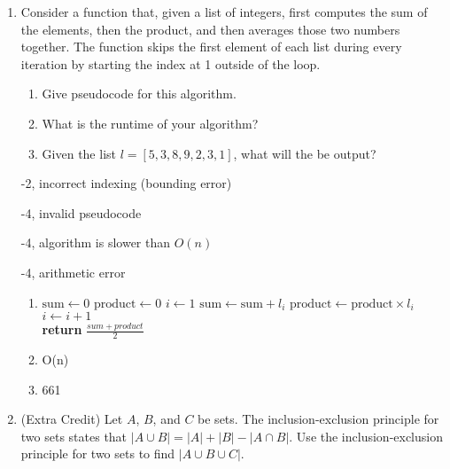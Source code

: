 \begin{enumerate}
\begin{solution}
\end{solution}

\item Consider a function that, given a list of integers, first computes the sum of the elements, then the product, and then averages those two numbers together. The function skips the first element of each list during every iteration by starting the index at 1 outside of the loop. 
\begin{enumerate}
    \item Give pseudocode for this algorithm.
    \item What is the runtime of your algorithm?
    \item Given the list $l = [5,3,8,9,2,3,1]$, what will the be output?
\end{enumerate}

\begin{rubric}
-2, incorrect indexing (bounding error)

-4, invalid pseudocode

-4, algorithm is slower than $O(n)$

-4, arithmetic error
\end{rubric}

\begin{solution}
\begin{enumerate}
    \item 
    \begin{algorithmic}
    \State $\text{sum} \gets 0$
    \State $\text{product} \gets 0$
    \State $i \gets 1$
        \State $\text{sum} \gets \text{sum} + l_{i}$
        \State $\text{product} \gets \text{product} \times l_{i}$
        \State $i \gets i + 1$
        \EndWhile \\
    \textbf{return} $\frac{sum+product}{2}$
\end{algorithmic}

    \item O(n)
    \item 661
\end{enumerate}
\end{solution}

\item (Extra Credit) Let $A$, $B$, and $C$ be sets. The inclusion-exclusion principle for two sets states that $|A \cup B| = |A| + |B| - |A \cap B|$. Use the inclusion-exclusion principle for two sets to find $|A \cup B \cup C|.$ 


\end{enumerate}
